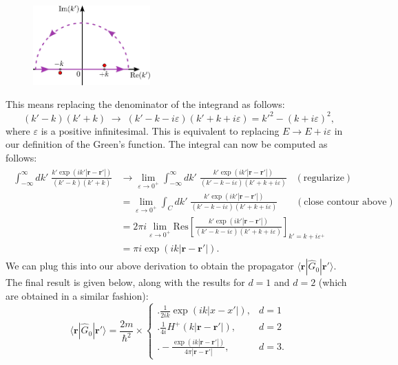 \documentclass[pra,12pt]{revtex4}
\begin{document}
\begin{figure}[h!]
  \centering\includegraphics[width=0.4\textwidth]{greencontour}
\end{figure}

\noindent
This means replacing the denominator of the integrand as
follows:
\begin{equation}
  (k' - k)(k'+k) \;\rightarrow\; (k' - k - i\varepsilon)(k'+k+i\varepsilon) = {k'}^2 - (k+i\varepsilon)^2,
\end{equation}
where $\varepsilon$ is a positive infinitesimal.  This is equivalent
to replacing $E \rightarrow E + i\varepsilon$ in our definition of the
Green's function.  The integral can now be computed as
follows:
\begin{align}
  \begin{aligned}\int_{-\infty}^\infty dk' \; \frac{\displaystyle k' \exp\left(ik'|\mathbf{r}-\mathbf{r}'|\right)}{(k' - k)(k'+k)} &\rightarrow \lim_{\varepsilon \rightarrow 0^+} \int_{-\infty}^\infty dk' \; \frac{\displaystyle k' \exp\left(ik'|\mathbf{r}-\mathbf{r}'|\right)}{(k' - k - i\varepsilon)(k'+k+i\varepsilon)}\;\;\; (\text{regularize}) \\ &= \lim_{\varepsilon \rightarrow 0^+} \int_C dk' \; \frac{\displaystyle k' \exp\left(ik'|\mathbf{r}-\mathbf{r}'|\right)}{(k' - k - i\varepsilon)(k'+k+i\varepsilon)} \quad\;\;\; (\text{close contour above}) \\ &= 2\pi i \lim_{\varepsilon \rightarrow 0^+} \mathrm{Res}\left[\frac{\displaystyle k' \exp\left(ik'|\mathbf{r}-\mathbf{r}'|\right)}{(k' - k - i\varepsilon)(k'+k+i\varepsilon)}\right]_{k'=k+i\varepsilon^+} \\ &= \pi i \exp\left(ik|\mathbf{r}-\mathbf{r}'|\right).\end{aligned}
\end{align}
We can plug this into our above derivation to obtain the propagator
$\langle\mathbf{r}|\hat{G}_0|\mathbf{r}'\rangle$.  The final result is
given below, along with the results for $d=1$ and $d=2$ (which are
obtained in a similar fashion):
$$\boxed{\;\;\;\langle\mathbf{r}|\hat{G}_0|\mathbf{r}'\rangle = \frac{2m}{\hbar^2} \times \begin{cases} \Bigg.\displaystyle\frac{1}{2ik} \exp\left(ik|x-x'|\right),& d=1\\ \Bigg. \displaystyle\frac{1}{4i} H^+(k|\mathbf{r}-\mathbf{r'}|), & d=2 \\ \displaystyle \Bigg. - \frac{\exp\left(ik|\mathbf{r}-\mathbf{r}'|\right)}{4\pi|\mathbf{r}-\mathbf{r}'|}, & d = 3.  \end{cases}\;\;\;}$$
\end{document}
